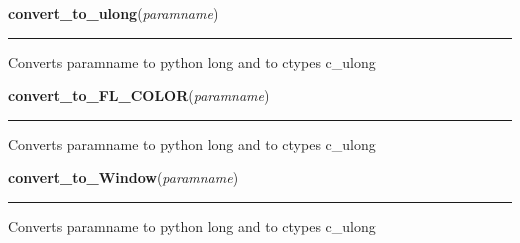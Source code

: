     \label{xformslib:library:convert_to_ulong}

    \vspace{0.5ex}

\hspace{.8\funcindent}\begin{boxedminipage}{\funcwidth}

    \raggedright \textbf{convert\_to\_ulong}(\textit{paramname})

    \vspace{-1.5ex}

    \rule{\textwidth}{0.5\fboxrule}
\setlength{\parskip}{2ex}
    Converts paramname to python long and to ctypes c\_ulong

\setlength{\parskip}{1ex}
    \end{boxedminipage}

    \label{xformslib:library:convert_to_ulong}

    \vspace{0.5ex}

\hspace{.8\funcindent}\begin{boxedminipage}{\funcwidth}

    \raggedright \textbf{convert\_to\_FL\_COLOR}(\textit{paramname})

    \vspace{-1.5ex}

    \rule{\textwidth}{0.5\fboxrule}
\setlength{\parskip}{2ex}
    Converts paramname to python long and to ctypes c\_ulong

\setlength{\parskip}{1ex}
    \end{boxedminipage}

    \label{xformslib:library:convert_to_ulong}

    \vspace{0.5ex}

\hspace{.8\funcindent}\begin{boxedminipage}{\funcwidth}

    \raggedright \textbf{convert\_to\_Window}(\textit{paramname})

    \vspace{-1.5ex}

    \rule{\textwidth}{0.5\fboxrule}
\setlength{\parskip}{2ex}
    Converts paramname to python long and to ctypes c\_ulong

\setlength{\parskip}{1ex}
    \end{boxedminipage}

